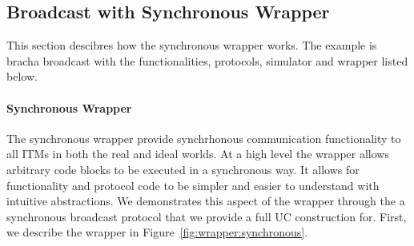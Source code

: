 %
%
%
%	
%
%
%	
%
%	
%

\subsection{Broadcast with Synchronous Wrapper}
This section descibres how the synchronous wrapper works.
The example is bracha broadcast with the functionalities, protocols, simulator and wrapper listed below.

\paragraph{Synchronous Wrapper}
The synchronous wrapper provide synchrhonous communication functionality to all ITMs in both the real and ideal worlds.
At a high level the wrapper allows arbitrary code blocks to be executed in a synchronous way.
It allows for functionality and protocol code to be simpler and easier to understand with intuitive abstractions. 
We demonstrates this aspect of the wrapper through the a synchronous broadcast protocol that we provide a full UC construction for.
First, we describe the wrapper in Figure~\ref{fig:wrapper:synchronous}.

